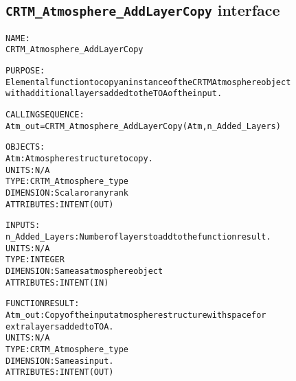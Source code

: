 \subsection{\texttt{CRTM\_Atmosphere\_AddLayerCopy} interface}
  \label{sec:CRTM_Atmosphere_AddLayerCopy_interface}
  \begin{alltt}
 
  NAME:
        CRTM_Atmosphere_AddLayerCopy
  
  PURPOSE:
        Elemental function to copy an instance of the CRTM Atmosphere object
        with additional layers added to the TOA of the input.
 
  CALLING SEQUENCE:
        Atm_out = CRTM_Atmosphere_AddLayerCopy( Atm, n_Added_Layers )
 
  OBJECTS:
        Atm:             Atmosphere structure to copy.
                         UNITS:      N/A
                         TYPE:       CRTM_Atmosphere_type
                         DIMENSION:  Scalar or any rank
                         ATTRIBUTES: INTENT(OUT)
 
  INPUTS:
        n_Added_Layers:  Number of layers to add to the function result.
                         UNITS:      N/A
                         TYPE:       INTEGER
                         DIMENSION:  Same as atmosphere object
                         ATTRIBUTES: INTENT(IN)
 
  FUNCTION RESULT:
        Atm_out:         Copy of the input atmosphere structure with space for
                         extra layers added to TOA.
                         UNITS:      N/A
                         TYPE:       CRTM_Atmosphere_type
                         DIMENSION:  Same as input.
                         ATTRIBUTES: INTENT(OUT)
 
 
  \end{alltt}
